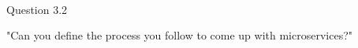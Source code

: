 \\
\begin{shaded} Question 3.2 \end{shaded} \label{question:hybris_architecture/interview/question_3.2}
"Can you define the process you follow to come up with microservices?"\\

